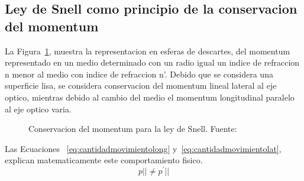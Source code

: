 \documentclass[letterpaper, 10 pt, conference]{ieeeconf}  %
\begin{document}
\subsection{Ley de Snell como principio de la conservacion del momentum}
La Figura~\ref{fig:PrincipioConservacionMomentumSnell}, muestra la representacion en esferas de descartes, del momentum representado en un medio determinado con un radio igual un indice de refraccion n menor al medio con indice de refraccion n'. Debido  que se considera una superficie lisa, se considera conservacion del momentum lineal lateral al eje optico, mientras debido al cambio del medio el momentum longitudinal paralelo al eje optico varia.

\begin{figure}[ht!]
\caption{Conservacion del momentum para la ley de Snell. Fuente:~\cite{1}
}\label{fig:PrincipioConservacionMomentumSnell}
\end{figure}
Las Ecuaciones ~\eqref{eq:cantidadmovimientolong} y~\eqref{eq:cantidadmovimientolat}, explican matematicamente este comportamiento fisico.
\begin{equation}
\label{eq:cantidadmovimientolong}
{
p|| \ne {p^'}||
}
\end{equation}
\end{document}
